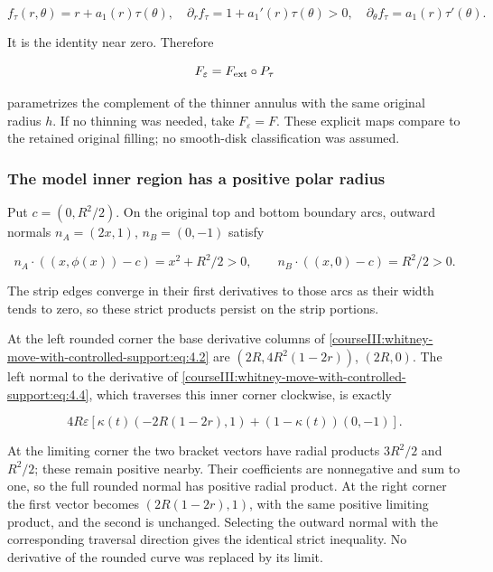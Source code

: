 \begin{equation}
f_\tau(r,\theta)=r+a_1(r)\tau(\theta),
\quad
\partial_rf_\tau=1+a_1'(r)\tau(\theta)>0,
\quad
\partial_\theta f_\tau=a_1(r)\tau'(\theta).
\label{courseIII:whitney-move-with-controlled-support:eq:4.8}
\end{equation}

It is the identity near zero. Therefore

\begin{equation}
F_\varepsilon=F_{\rm ext}\circ P_\tau
\label{courseIII:whitney-move-with-controlled-support:eq:4.9}
\end{equation}

parametrizes the complement of the thinner annulus with the same original radius \(h\). If no thinning was needed, take \(F_\varepsilon=F\). These explicit maps compare to the retained original filling; no smooth-disk classification was assumed.

\subsubsection{The model inner region has a positive polar radius}
\label{courseIII:whitney-move-with-controlled-support:section-4.2}

Put \(c=(0,R^2/2)\). On the original top and bottom boundary arcs, outward normals \(n_A=(2x,1)\), \(n_B=(0,-1)\) satisfy

\begin{equation}
n_A\cdot((x,\phi(x))-c)=x^2+R^2/2>0,\qquad
n_B\cdot((x,0)-c)=R^2/2>0.
\label{courseIII:whitney-move-with-controlled-support:eq:4.10}
\end{equation}

The strip edges converge in their first derivatives to those arcs as their width tends to zero, so these strict products persist on the strip portions.

At the left rounded corner the base derivative columns of \eqref{courseIII:whitney-move-with-controlled-support:eq:4.2} are \((2R,4R^2(1-2r))\), \((2R,0)\). The left normal to the derivative of \eqref{courseIII:whitney-move-with-controlled-support:eq:4.4}, which traverses this inner corner clockwise, is exactly

\begin{equation}
4R\varepsilon\left[
\kappa(t)(-2R(1-2r),1)+(1-\kappa(t))(0,-1)\right].
\label{courseIII:whitney-move-with-controlled-support:eq:4.11}
\end{equation}

At the limiting corner the two bracket vectors have radial products \(3R^2/2\) and \(R^2/2\); these remain positive nearby. Their coefficients are nonnegative and sum to one, so the full rounded normal has positive radial product. At the right corner the first vector becomes \((2R(1-2r),1)\), with the same positive limiting product, and the second is unchanged. Selecting the outward normal with the corresponding traversal direction gives the identical strict inequality. No derivative of the rounded curve was replaced by its limit.

